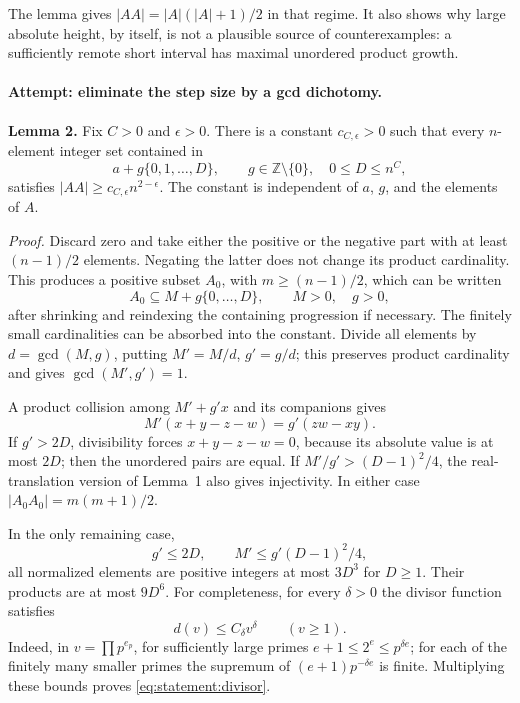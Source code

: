 \documentclass[11pt,a4paper]{article}
\newcommand{\Z}{\mathbb{Z}}
\numberwithin{equation}{section}
\begin{document}
The lemma gives $|AA|=|A|(|A|+1)/2$ in that regime. It also shows why
large absolute height, by itself, is not a plausible source of
counterexamples: a sufficiently remote short interval has maximal
unordered product growth.

\paragraph{Attempt: eliminate the step size by a gcd dichotomy.}
\textbf{Lemma 2.} Fix $C>0$ and $\epsilon>0$. There is a constant
$c_{C,\epsilon}>0$ such that every $n$-element integer set contained in
\[
 a+g\{0,1,\ldots,D\},\qquad g\in\Z\setminus\{0\},\quad
 0\leq D\leq n^C,
\]
satisfies $|AA|\geq c_{C,\epsilon}n^{2-\epsilon}$.
The constant is independent of $a$, $g$, and the elements of $A$.

\emph{Proof.} Discard zero and take either the positive or the negative
part with at least $(n-1)/2$ elements. Negating the latter does not change
its product cardinality. This produces a positive subset $A_0$, with
$m\geq(n-1)/2$, which can be written
\[
 A_0\subseteq M+g\{0,\ldots,D\},\qquad M>0,\quad g>0,
\]
after shrinking and reindexing the containing progression if necessary.
The finitely small cardinalities can be absorbed into the constant.
Divide all elements by $d=\gcd(M,g)$, putting $M'=M/d$, $g'=g/d$;
this preserves product cardinality and gives $\gcd(M',g')=1$.

A product collision among $M'+g'x$ and its companions gives
\begin{equation}\label{eq:statement:divisibility}
 M'(x+y-z-w)=g'(zw-xy).
\end{equation}
If $g'>2D$, divisibility forces $x+y-z-w=0$, because its absolute value
is at most $2D$; then the unordered pairs are equal. If
$M'/g'>(D-1)^2/4$, the real-translation version of Lemma~1 also gives
injectivity. In either case $|A_0A_0|=m(m+1)/2$.

In the only remaining case,
\[
 g'\leq2D,\qquad M'\leq g'(D-1)^2/4,
\]
all normalized elements are positive integers at most $3D^3$ for $D\geq1$.
Their products are at most $9D^6$. For completeness, for every $\delta>0$
the divisor function satisfies
\begin{equation}\label{eq:statement:divisor}
 d(v)\leq C_\delta v^\delta\qquad(v\geq1).
\end{equation}
Indeed, in $v=\prod p^{e_p}$, for sufficiently large primes
$e+1\leq2^e\leq p^{\delta e}$; for each of the finitely many smaller
primes the supremum of $(e+1)p^{-\delta e}$ is finite. Multiplying these
bounds proves \eqref{eq:statement:divisor}.
\end{document}
